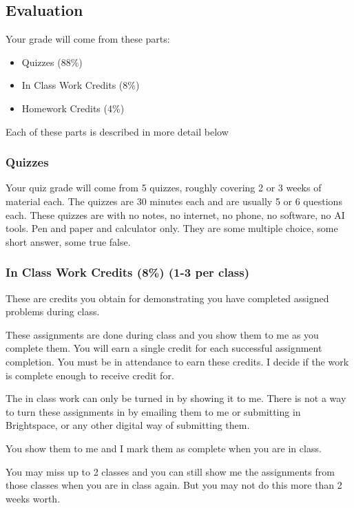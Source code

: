 \documentclass[
  letterpaper,
  DIV=11,
  numbers=noendperiod]{scrartcl}
\providecommand{\tightlist}{%
  \setlength{\itemsep}{0pt}\setlength{\parskip}{0pt}}
\begin{document}
\subsection{Evaluation}\label{evaluation}

Your grade will come from these parts:

\begin{itemize}
\tightlist
\item
  Quizzes (88\%)
\item
  In Class Work Credits (8\%)
\item
  Homework Credits (4\%)
\end{itemize}

Each of these parts is described in more detail below

\subsubsection{Quizzes}\label{quizzes}

Your quiz grade will come from 5 quizzes, roughly covering 2 or 3 weeks
of material each. The quizzes are 30 minutes each and are usually 5 or 6
questions each. These quizzes are with no notes, no internet, no phone,
no software, no AI tools. Pen and paper and calculator only. They are
some multiple choice, some short answer, some true false.

\subsubsection{In Class Work Credits (8\%) (1-3 per
class)}\label{in-class-work-credits-8-1-3-per-class}

These are credits you obtain for demonstrating you have completed
assigned problems during class.

These assignments are done during class and you show them to me as you
complete them. You will earn a single credit for each successful
assignment completion. You must be in attendance to earn these credits.
I decide if the work is complete enough to receive credit for.

The in class work can only be turned in by showing it to me. There is
not a way to turn these assignments in by emailing them to me or
submitting in Brightspace, or any other digital way of submitting them.

You show them to me and I mark them as complete when you are in class.

You may miss up to 2 classes and you can still show me the assignments
from those classes when you are in class again. But you may not do this
more than 2 weeks worth.
\end{document}

